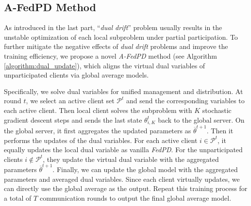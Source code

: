 \subsection{A-FedPD Method}

As introduced in the last part, ``\textit{dual drift}'' problem usually results in the unstable optimization of each local subproblem under partial participation.
To further mitigate the negative effects of \textit{dual drift} problems and improve the training efficiency, we propose a novel \textit{A-FedPD} method (see Algorithm \ref{algorithm:dual_update}), which aligns the virtual dual variables of unparticipated clients via global average models.

Specifically, we solve dual variables for unified management and distribution. At round $t$, we select an active client set $\mathcal{P}^t$ and send the corresponding variables to each active client. Then local client solves the subproblem with $K$ stochastic gradient descent steps and sends the last state $\theta_{i,K}^t$ back to the global server. On the global server, it first aggregates the updated parameters as $\overline{\theta}^{t+1}$. Then it performs the updates of the dual variables. For each active client $i\in\mathcal{P}^t$, it equally updates the local dual variable as vanilla \textit{FedPD}. For the unparticipated clients $i\notin \mathcal{P}^t$, they update the virtual dual variable with the aggregated parameters $\overline{\theta}^{t+1}$. Finally, we can update the global model with the aggregated parameters and averaged dual variables. Since each client virtually updates, we can directly use the global average as the output. Repeat this training process for a total of $T$ communication rounds to output the final global average model. 

